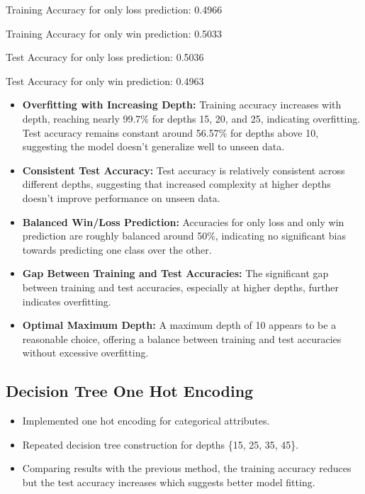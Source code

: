 \documentclass[12pt]{article}
\begin{document}
Training Accuracy for only loss prediction: 0.4966

Training Accuracy for only win prediction: 0.5033

Test Accuracy for only loss prediction: 0.5036

Test Accuracy for only win prediction: 0.4963

\begin{itemize}
    \item \textbf{Overfitting with Increasing Depth:} Training accuracy increases with depth, reaching nearly 99.7\% for depths 15, 20, and 25, indicating overfitting. Test accuracy remains constant around 56.57\% for depths above 10, suggesting the model doesn't generalize well to unseen data.
    
    \item \textbf{Consistent Test Accuracy:} Test accuracy is relatively consistent across different depths, suggesting that increased complexity at higher depths doesn't improve performance on unseen data.
    
    \item \textbf{Balanced Win/Loss Prediction:} Accuracies for only loss and only win prediction are roughly balanced around 50\%, indicating no significant bias towards predicting one class over the other.
    
    \item \textbf{Gap Between Training and Test Accuracies:} The significant gap between training and test accuracies, especially at higher depths, further indicates overfitting.
    
    \item \textbf{Optimal Maximum Depth:} A maximum depth of 10 appears to be a reasonable choice, offering a balance between training and test accuracies without excessive overfitting.
\end{itemize}


\subsection{Decision Tree One Hot Encoding}
    \begin{itemize}
        \item Implemented one hot encoding for categorical attributes.
        \item Repeated decision tree construction for depths \{15, 25, 35, 45\}.
        \item Comparing results with the previous method, the training accuracy reduces but the test accuracy increases which suggests better model fitting.
    \end{itemize}
\end{document}
